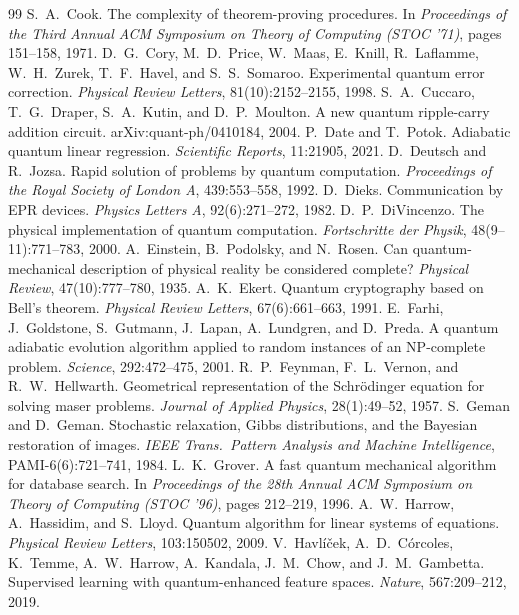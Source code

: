 \begin{thebibliography}{99}
 S.~A.~Cook. The complexity of theorem-proving procedures. In \emph{Proceedings of the Third Annual ACM Symposium on Theory of Computing (STOC '71)}, pages 151--158, 1971.
 D.~G.~Cory, M.~D.~Price, W.~Maas, E.~Knill, R.~Laflamme, W.~H.~Zurek, T.~F.~Havel, and S.~S.~Somaroo. Experimental quantum error correction. \emph{Physical Review Letters}, 81(10):2152--2155, 1998.
 S.~A.~Cuccaro, T.~G.~Draper, S.~A.~Kutin, and D.~P.~Moulton. A new quantum ripple-carry addition circuit. arXiv:quant-ph/0410184, 2004.
 P.~Date and T.~Potok. Adiabatic quantum linear regression. \emph{Scientific Reports}, 11:21905, 2021.
 D.~Deutsch and R.~Jozsa. Rapid solution of problems by quantum computation. \emph{Proceedings of the Royal Society of London A}, 439:553--558, 1992.
 D.~Dieks. Communication by EPR devices. \emph{Physics Letters A}, 92(6):271--272, 1982.
 D.~P.~DiVincenzo. The physical implementation of quantum computation. \emph{Fortschritte der Physik}, 48(9--11):771--783, 2000.
 A.~Einstein, B.~Podolsky, and N.~Rosen. Can quantum-mechanical description of physical reality be considered complete? \emph{Physical Review}, 47(10):777--780, 1935.
 A.~K.~Ekert. Quantum cryptography based on Bell's theorem. \emph{Physical Review Letters}, 67(6):661--663, 1991.
 E.~Farhi, J.~Goldstone, S.~Gutmann, J.~Lapan, A.~Lundgren, and D.~Preda. A quantum adiabatic evolution algorithm applied to random instances of an NP-complete problem. \emph{Science}, 292:472--475, 2001.
 R.~P.~Feynman, F.~L.~Vernon, and R.~W.~Hellwarth. Geometrical representation of the Schrödinger equation for solving maser problems. \emph{Journal of Applied Physics}, 28(1):49--52, 1957.
 S.~Geman and D.~Geman. Stochastic relaxation, Gibbs distributions, and the Bayesian restoration of images. \emph{IEEE Trans.\ Pattern Analysis and Machine Intelligence}, PAMI-6(6):721--741, 1984.
 L.~K.~Grover. A fast quantum mechanical algorithm for database search. In \emph{Proceedings of the 28th Annual ACM Symposium on Theory of Computing (STOC '96)}, pages 212--219, 1996.
 A.~W.~Harrow, A.~Hassidim, and S.~Lloyd. Quantum algorithm for linear systems of equations. \emph{Physical Review Letters}, 103:150502, 2009.
 V.~Havlíček, A.~D.~Córcoles, K.~Temme, A.~W.~Harrow, A.~Kandala, J.~M.~Chow, and J.~M.~Gambetta. Supervised learning with quantum-enhanced feature spaces. \emph{Nature}, 567:209--212, 2019.

\end{thebibliography}
